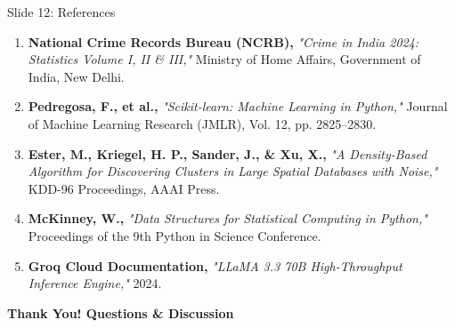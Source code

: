 \documentclass[aspectratio=169,10pt]{beamer}
\begin{document}
\begin{frame}{Slide 12: References}
    \footnotesize
    \begin{enumerate}
        \item \textbf{National Crime Records Bureau (NCRB),} \textit{"Crime in India 2024: Statistics Volume I, II \& III,"} Ministry of Home Affairs, Government of India, New Delhi.
        \item \textbf{Pedregosa, F., et al.,} \textit{"Scikit-learn: Machine Learning in Python,"} Journal of Machine Learning Research (JMLR), Vol. 12, pp. 2825--2830.
        \item \textbf{Ester, M., Kriegel, H. P., Sander, J., \& Xu, X.,} \textit{"A Density-Based Algorithm for Discovering Clusters in Large Spatial Databases with Noise,"} KDD-96 Proceedings, AAAI Press.
        \item \textbf{McKinney, W.,} \textit{"Data Structures for Statistical Computing in Python,"} Proceedings of the 9th Python in Science Conference.
        \item \textbf{Groq Cloud Documentation,} \textit{"LLaMA 3.3 70B High-Throughput Inference Engine,"} 2024.
    \end{enumerate}

    \vspace{0.3cm}
    \centering
    \textcolor{navyblue}{\textbf{\large Thank You! Questions \& Discussion}}
\end{frame}
\end{document}
